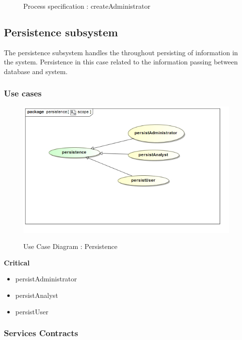 \documentclass{article}
\begin{document}
		\begin{figure}[H]
		\caption{Process specification : createAdministrator}
		\end{figure}

	\pagebreak
	\subsection{Persistence subsystem}\label{subsec:Persistence}
	The persistence subsystem handles the throughout persisting of information in the system. Persistence in this case related to the information passing between database and system.
		\subsubsection{Use cases}

		\begin{figure}[H]
		\includegraphics[width=\textwidth]{images/uc__persistence__scope.jpg}  \\
		\caption{Use Case Diagram : Persistence}
		\end{figure}

		\begin{flushleft}
			\textbf{Critical}
				\begin{itemize}
					\item persistAdministrator
					\item persistAnalyst
					\item persistUser
				\end{itemize}
		\end{flushleft}

		\subsubsection{Services Contracts}
\end{document}
